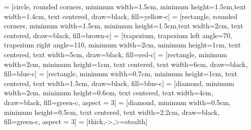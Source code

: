 \documentclass{article}
\begin{document}
         = [circle, rounded corners, minimum width=1.5cm, minimum height=1.5cm,text width=1.4cm, text centered, draw=black, fill=yellow-c]
         = [rectangle, rounded corners, minimum width=1.5cm, minimum height=1.5cm,text width=2cm, text centered, draw=black, fill=brown-c]
         = [trapezium, trapezium left angle=70, trapezium right angle=110, minimum width=2cm, minimum height=1cm, text centered, text width=5cm, draw=black, fill=red-c]
         = [rectangle, minimum width=2cm, minimum height=1cm, text centered, text width=6cm, draw=black, fill=blue-c]
         = [rectangle, minimum width=0.7cm, minimum height=1cm, text centered, text width=1.5cm, draw=black, fill=blue-c]
         = [diamond, minimum width=2cm, minimum height=0.6cm, text centered, text width=4cm, draw=black, fill=green-c, aspect = 3]
         = [diamond, minimum width=0.5cm, minimum height=0.5cm, text centered, text width=2.2cm, draw=black, fill=green-c, aspect = 3]
         = [thick,->,>=stealth]
       
\end{document}
